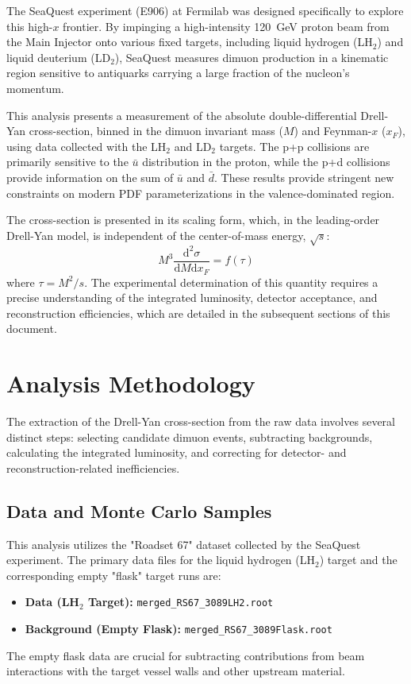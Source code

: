 \documentclass[11pt]{article}
\newcommand{\diffd}{\mathrm{d}}
\begin{document}
The SeaQuest experiment (E906) at Fermilab was designed specifically to explore this high-$x$ frontier. By impinging a high-intensity \SI{120}{\giga\electronvolt} proton beam from the Main Injector onto various fixed targets, including liquid hydrogen (LH$_2$) and liquid deuterium (LD$_2$), SeaQuest measures dimuon production in a kinematic region sensitive to antiquarks carrying a large fraction of the nucleon's momentum.

This analysis presents a measurement of the absolute double-differential Drell-Yan cross-section, binned in the dimuon invariant mass ($M$) and Feynman-$x$ ($x_F$), using data collected with the LH$_2$ and LD$_2$ targets. The p+p collisions are primarily sensitive to the $\bar{u}$ distribution in the proton, while the p+d collisions provide information on the sum of $\bar{u}$ and $\bar{d}$. These results provide stringent new constraints on modern PDF parameterizations in the valence-dominated region.

The cross-section is presented in its scaling form, which, in the leading-order Drell-Yan model, is independent of the center-of-mass energy, $\sqrt{s}$:
\begin{equation}
    M^{3}\frac{\diffd^{2}\sigma}{\diffd M \diffd x_{F}} = f(\tau)
\end{equation}
where $\tau = M^2/s$. The experimental determination of this quantity requires a precise understanding of the integrated luminosity, detector acceptance, and reconstruction efficiencies, which are detailed in the subsequent sections of this document.

\section{Analysis Methodology}
\label{sec:methodology}
The extraction of the Drell-Yan cross-section from the raw data involves several distinct steps: selecting candidate dimuon events, subtracting backgrounds, calculating the integrated luminosity, and correcting for detector- and reconstruction-related inefficiencies.

\subsection{Data and Monte Carlo Samples}
This analysis utilizes the "Roadset 67" dataset collected by the SeaQuest experiment. The primary data files for the liquid hydrogen (LH$_2$) target and the corresponding empty "flask" target runs are:
\begin{itemize}
    \item \textbf{Data (LH$_2$ Target):} \texttt{merged\_RS67\_3089LH2.root}
    \item \textbf{Background (Empty Flask):} \texttt{merged\_RS67\_3089Flask.root}
\end{itemize}
The empty flask data are crucial for subtracting contributions from beam interactions with the target vessel walls and other upstream material.
\end{document}

